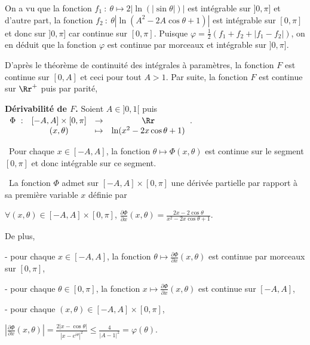 {\begin{enumerate}
{On a vu que la fonction $f_1~:~\theta\mapsto2\left|\ln(|\sin\theta|)\right|$ est intégrable sur $]0,\pi]$ et d'autre part, la fonction $f_2~:~\theta\left|\ln(A^2-2A\cos\theta+1)\right|$ est intégrable sur $[0,\pi]$ et donc sur $]0,\pi]$ car continue sur $[0,\pi]$. Puisque $\varphi=\frac{1}{2}(f_1+f_2+|f_1-f_2|)$, on en déduit que la fonction $\varphi$ est continue par morceaux et intégrable sur $]0,\pi]$.

D'après le théorème de continuité des intégrales à paramètres, la fonction $F$ est continue sur $[0,A]$ et ceci pour tout $A>1$. Par suite, la fonction $F$ est continue sur $\Rr^+$ puis par parité,

\begin{center}
\end{center}
 

\textbf{Dérivabilité de $F$.} Soient $A\in]0,1[$ puis  $\begin{array}[t]{cccc}
\Phi~:&[-A,A]\times[0,\pi]&\rightarrow&\Rr\\
 &(x,\theta)&\mapsto&\ln(x^2-2x\cos\theta+1)
\end{array}$.

\textbullet~Pour chaque $x\in[-A,A]$, la fonction $\theta\mapsto \Phi(x,\theta)$ est continue sur le segment $[0,\pi]$ et donc intégrable sur ce segment.

\textbullet~La fonction $\Phi$ admet sur $[-A,A]\times[0,\pi]$ une dérivée partielle par rapport à sa première variable $x$ définie par

\begin{center}
$\forall(x,\theta)\in[-A,A]\times[0,\pi]$, $\frac{\partial \Phi}{\partial x}(x,\theta)=\frac{2x-2\cos\theta}{x^2-2x\cos\theta+1}$.
\end{center}

De plus,

- pour chaque $x\in[-A,A]$, la fonction $\theta\mapsto\frac{\partial \Phi}{\partial x}(x,\theta)$ est continue par morceaux sur $[0,\pi]$,

- pour chaque $\theta\in[0,\pi]$, la fonction $x\mapsto\frac{\partial \Phi}{\partial x}(x,\theta)$ est continue sur $[-A,A]$,

- pour chaque $(x,\theta)\in[-A,A]\times[0,\pi]$,

\begin{center}
$\left|\frac{\partial \Phi}{\partial x}(x,\theta)\right|=\frac{2|x-\cos\theta|}{|x-e^{i\theta}|^2}\leqslant\frac{4}{|A-1|^2}=\varphi(\theta)$.
\end{center}

}
\end{enumerate}}
